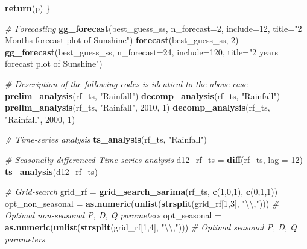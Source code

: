 \documentclass[
  11pt,
]{article}
\newenvironment{Shaded}{\begin{snugshade}}{\end{snugshade}}
\newcommand{\CharTok}[1]{\textcolor[rgb]{0.31,0.60,0.02}{#1}}
\newcommand{\CommentTok}[1]{\textcolor[rgb]{0.56,0.35,0.01}{\textit{#1}}}
\newcommand{\DataTypeTok}[1]{\textcolor[rgb]{0.13,0.29,0.53}{#1}}
\newcommand{\DecValTok}[1]{\textcolor[rgb]{0.00,0.00,0.81}{#1}}
\newcommand{\KeywordTok}[1]{\textcolor[rgb]{0.13,0.29,0.53}{\textbf{#1}}}
\newcommand{\NormalTok}[1]{#1}
\newcommand{\StringTok}[1]{\textcolor[rgb]{0.31,0.60,0.02}{#1}}
\begin{document}
\begin{Shaded}
\begin{Highlighting}[]
{{{  \KeywordTok{return}\NormalTok{(p)}
\NormalTok{\}}

\CommentTok{# Forecasting}
\KeywordTok{gg_forecast}\NormalTok{(best_guess_ss, }\DataTypeTok{n_forecast=}\DecValTok{2}\NormalTok{, }\DataTypeTok{include=}\DecValTok{12}\NormalTok{, }\DataTypeTok{title=}\StringTok{"2 Months forecast plot of Sunshine"}\NormalTok{)}
\KeywordTok{forecast}\NormalTok{(best_guess_ss, }\DecValTok{2}\NormalTok{)}
\KeywordTok{gg_forecast}\NormalTok{(best_guess_ss, }\DataTypeTok{n_forecast=}\DecValTok{24}\NormalTok{, }\DataTypeTok{include=}\DecValTok{120}\NormalTok{, }\DataTypeTok{title=}\StringTok{"2 years forecast plot of Sunshine"}\NormalTok{)}

\CommentTok{# Description of the following codes is identical to the above case}
\KeywordTok{prelim_analysis}\NormalTok{(rf_ts, }\StringTok{"Rainfall"}\NormalTok{)}
\KeywordTok{decomp_analysis}\NormalTok{(rf_ts, }\StringTok{"Rainfall"}\NormalTok{)}
\KeywordTok{prelim_analysis}\NormalTok{(rf_ts, }\StringTok{"Rainfall"}\NormalTok{, }\DecValTok{2010}\NormalTok{, }\DecValTok{1}\NormalTok{)}
\KeywordTok{decomp_analysis}\NormalTok{(rf_ts, }\StringTok{"Rainfall"}\NormalTok{, }\DecValTok{2000}\NormalTok{, }\DecValTok{1}\NormalTok{)}

\CommentTok{# Time-series analysis}
\KeywordTok{ts_analysis}\NormalTok{(rf_ts, }\StringTok{"Rainfall"}\NormalTok{)}

\CommentTok{# Seasonally differenced Time-series analysis}
\NormalTok{d12_rf_ts =}\StringTok{ }\KeywordTok{diff}\NormalTok{(rf_ts, }\DataTypeTok{lag =} \DecValTok{12}\NormalTok{)}
\KeywordTok{ts_analysis}\NormalTok{(d12_rf_ts)}

\CommentTok{# Grid-search}
\NormalTok{grid_rf =}\StringTok{ }\KeywordTok{grid_search_sarima}\NormalTok{(rf_ts, }
                            \KeywordTok{c}\NormalTok{(}\DecValTok{1}\NormalTok{,}\DecValTok{0}\NormalTok{,}\DecValTok{1}\NormalTok{), }
                            \KeywordTok{c}\NormalTok{(}\DecValTok{0}\NormalTok{,}\DecValTok{1}\NormalTok{,}\DecValTok{1}\NormalTok{))}
\NormalTok{opt_non_seasonal =}\StringTok{ }\KeywordTok{as.numeric}\NormalTok{(}\KeywordTok{unlist}\NormalTok{(}\KeywordTok{strsplit}\NormalTok{(grid_rf[}\DecValTok{1}\NormalTok{,}\DecValTok{3}\NormalTok{], }\StringTok{"}\CharTok{\textbackslash{}\textbackslash{}}\StringTok{,"}\NormalTok{))) }\CommentTok{# Optimal non-seasonal P, D, Q parameters}
\NormalTok{opt_seasonal =}\StringTok{ }\KeywordTok{as.numeric}\NormalTok{(}\KeywordTok{unlist}\NormalTok{(}\KeywordTok{strsplit}\NormalTok{(grid_rf[}\DecValTok{1}\NormalTok{,}\DecValTok{4}\NormalTok{], }\StringTok{"}\CharTok{\textbackslash{}\textbackslash{}}\StringTok{,"}\NormalTok{))) }\CommentTok{# Optimal seasonal P, D, Q parameters}

}}}
\end{Highlighting}
\end{Shaded}
\end{document}
